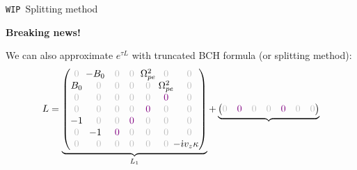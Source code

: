 \documentclass{beamer}
\newcommand{\mbold}[1]{{\textbf{\color{PLB}#1}}}
\newcommand{\I}{\dot{\imath}}
\begin{document}
\begin{frame}{{\small\texttt{WIP}\ }Splitting method}
  \vspace{-2cm}\hfill\begin{turn}{-30}{\large\mbold{\textcolor{mred}{Breaking news!}}}\end{turn}

  We can also approximate $e^{\tau L}$ with truncated BCH formula (or splitting method):
  $$
    L = \underbrace{\begin{pmatrix}
      \gz & \hspace{-0.25cm}-B_0 & \gz                   & \gz                   & \hspace{-0.125cm}\Omega_{pe}^2\hspace{-0.125cm} &                  \gz                            & \gz \\ 
      B_0 &                  \gz & \gz                   & \gz                   &                  \gz                            & \hspace{-0.125cm}\Omega_{pe}^2\hspace{-0.125cm} & \gz \\
      \gz &                  \gz & \gz                   & \gz                   &                  \gz                            &                  \textcolor{violet}{0}          & \gz \\ 
      \gz &                  \gz & \gz                   & \gz                   &                  \textcolor{violet}{0}          &                  \gz                            & \gz \\ 
      -1  &                  \gz & \gz                   & \textcolor{violet}{0} &                  \gz                            &                  \gz                            & \gz \\ 
      \gz & \hspace{-0.25cm}-1   & \textcolor{violet}{0} & \gz                   &                  \gz                            &                  \gz                            & \gz \\ 
      \gz &                  \gz & \gz                   & \gz                   &                  \gz                            &                  \gz                            & \hspace{-0.25cm}-\I v_z\kappa \\ 
    \end{pmatrix}}_{L_1}
    +
    \underbrace{\begin{pmatrix}
      \gz & \textcolor{violet}{0} & \gz                      &  \gz                      &  \textcolor{violet}{0}            & \gz                      & \gz \\ 

\end{pmatrix}}$$
\end{frame}
\end{document}
